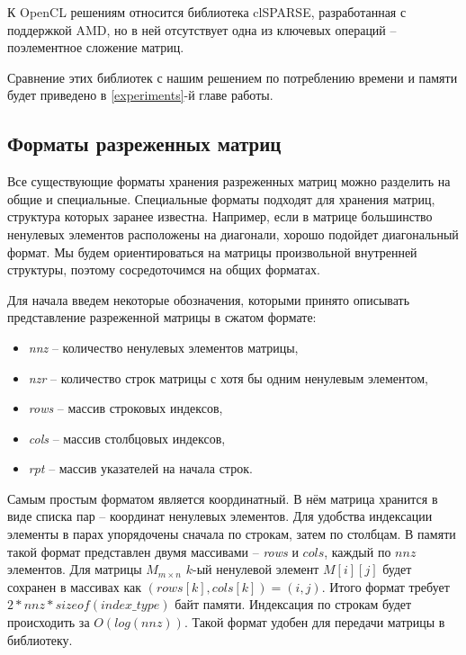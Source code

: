 \documentclass[14pt]{extarticle}
\newcommand{\txt}{\textit}
\begin{document}
	К OpenCL решениям относится библиотека clSPARSE, разработанная с поддержкой AMD, но в ней отсутствует одна из ключевых операций -- поэлементное сложение матриц. 
	
	Сравнение этих библиотек с нашим решением по потреблению времени и памяти будет приведено в \ref{experiments}-й главе работы. 
	
	
	\subsection{Форматы разреженных матриц}
	Все существующие форматы хранения разреженных матриц можно разделить на общие и специальные. Специальные форматы подходят для хранения матриц, структура которых заранее известна. Например, если в матрице большинство ненулевых элементов расположены на диагонали, хорошо подойдет диагональный формат. Мы будем ориентироваться на матрицы произвольной внутренней структуры, поэтому сосредоточимся на общих форматах. 
	
	Для начала введем некоторые обозначения, которыми принято описывать представление разреженной матрицы в сжатом формате:
	
	\begin{itemize}[itemsep=0mm, topsep=0pt]
		\item \txt{nnz} -- количество ненулевых элементов матрицы,
		\item \txt{nzr} -- количество строк матрицы с хотя бы одним ненулевым элементом,
		\item \txt{rows} -- массив строковых индексов,
		\item \txt{cols} --  массив столбцовых индексов,
		\item \txt{rpt} -- массив указателей на начала строк.
	\end{itemize}
	
	Самым простым форматом является координатный. В нём матрица хранится в виде списка пар – координат ненулевых элементов. Для удобства индексации элементы в парах упорядочены сначала по строкам, затем по столбцам. В памяти такой формат представлен двумя массивами – \txt{rows} и $cols$, каждый по $nnz$ элементов. Для матрицы $M_{m\times n}$ $k$-ый ненулевой элемент $M[i][j]$ будет сохранен в массивах как $(rows[k], cols[k]) = (i, j)$. Итого формат требует $2 * nnz * sizeof (index\_type)$ байт памяти. Индексация по строкам будет происходить за $O(log (nnz))$. Такой формат удобен для передачи матрицы в библиотеку.
	
\end{document}
